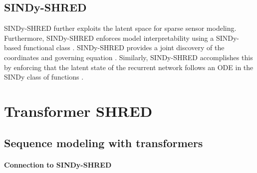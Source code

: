 \documentclass[11pt, a4paper]{article}
\begin{document}
\subsection{SINDy-SHRED}
SINDy-SHRED further exploits the latent space for sparse sensor modeling. Furthermore, SINDy-SHRED enforces model interpretability using a SINDy-based functional class \cite{gao2025sparseidentificationnonlineardynamics}. SINDy-SHRED provides a joint discovery of the coordinates and governing equation \cite{gao2025sparseidentificationnonlineardynamics}. Similarly, SINDy-SHRED accomplishes this by enforcing that the latent state of the recurrent network follows an ODE in the SINDy class of functions \cite{gao2025sparseidentificationnonlineardynamics}. 

\section{Transformer SHRED}


\label{sec:method}

\subsection{Sequence modeling with transformers}

\paragraph{Connection to SINDy-SHRED}
\end{document}
